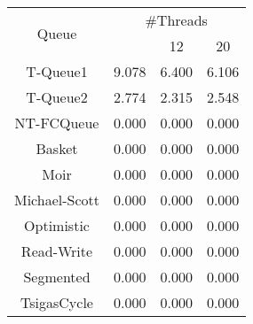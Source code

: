 \begin{tabular}{|c|c|c|c|}
\hline
\multirow{2}{*}{Queue} & \multicolumn{3}{c|}{\#Threads}\\\cline{2-4}& \quad 4 & 12 & 20\\
\hline
\hline
T-Queue1 & 9.078 & 6.400 & 6.106\\
T-Queue2 & 2.774 & 2.315 & 2.548\\
NT-FCQueue & 0.000 & 0.000 & 0.000\\
Basket & 0.000 & 0.000 & 0.000\\
Moir & 0.000 & 0.000 & 0.000\\
Michael-Scott & 0.000 & 0.000 & 0.000\\
Optimistic & 0.000 & 0.000 & 0.000\\
Read-Write & 0.000 & 0.000 & 0.000\\
Segmented & 0.000 & 0.000 & 0.000\\
TsigasCycle & 0.000 & 0.000 & 0.000\\
\hline\end{tabular}
